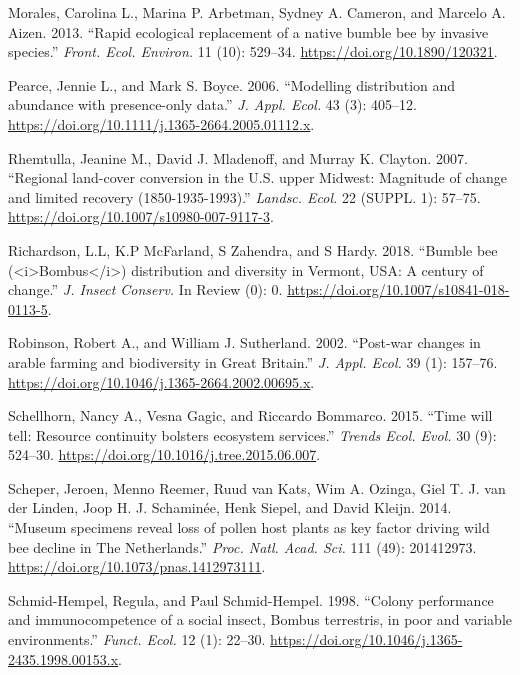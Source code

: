 \documentclass[11pt,]{article}
\begin{document}
\leavevmode\hypertarget{ref-Morales2013}{}%
Morales, Carolina L., Marina P. Arbetman, Sydney A. Cameron, and Marcelo
A. Aizen. 2013. ``Rapid ecological replacement of a native bumble bee by
invasive species.'' \emph{Front. Ecol. Environ.} 11 (10): 529--34.
\url{https://doi.org/10.1890/120321}.

\leavevmode\hypertarget{ref-Pearce2006}{}%
Pearce, Jennie L., and Mark S. Boyce. 2006. ``Modelling distribution and
abundance with presence-only data.'' \emph{J. Appl. Ecol.} 43 (3):
405--12. \url{https://doi.org/10.1111/j.1365-2664.2005.01112.x}.

\leavevmode\hypertarget{ref-Rhemtulla2007a}{}%
Rhemtulla, Jeanine M., David J. Mladenoff, and Murray K. Clayton. 2007.
``Regional land-cover conversion in the U.S. upper Midwest: Magnitude of
change and limited recovery (1850-1935-1993).'' \emph{Landsc. Ecol.} 22
(SUPPL. 1): 57--75. \url{https://doi.org/10.1007/s10980-007-9117-3}.

\leavevmode\hypertarget{ref-Richardson2018}{}%
Richardson, L.L, K.P McFarland, S Zahendra, and S Hardy. 2018. ``Bumble
bee (\textless{}i\textgreater{}Bombus\textless{}/i\textgreater{})
distribution and diversity in Vermont, USA: A century of change.''
\emph{J. Insect Conserv.} In Review (0): 0.
\url{https://doi.org/10.1007/s10841-018-0113-5}.

\leavevmode\hypertarget{ref-Robinson2002}{}%
Robinson, Robert A., and William J. Sutherland. 2002. ``Post-war changes
in arable farming and biodiversity in Great Britain.'' \emph{J. Appl.
Ecol.} 39 (1): 157--76.
\url{https://doi.org/10.1046/j.1365-2664.2002.00695.x}.

\leavevmode\hypertarget{ref-Schellhorn2015c}{}%
Schellhorn, Nancy A., Vesna Gagic, and Riccardo Bommarco. 2015. ``Time
will tell: Resource continuity bolsters ecosystem services.''
\emph{Trends Ecol. Evol.} 30 (9): 524--30.
\url{https://doi.org/10.1016/j.tree.2015.06.007}.

\leavevmode\hypertarget{ref-Scheper2014}{}%
Scheper, Jeroen, Menno Reemer, Ruud van Kats, Wim A. Ozinga, Giel T. J.
van der Linden, Joop H. J. Schaminée, Henk Siepel, and David Kleijn.
2014. ``Museum specimens reveal loss of pollen host plants as key factor
driving wild bee decline in The Netherlands.'' \emph{Proc. Natl. Acad.
Sci.} 111 (49): 201412973.
\url{https://doi.org/10.1073/pnas.1412973111}.

\leavevmode\hypertarget{ref-Schmid-Hempel1998a}{}%
Schmid-Hempel, Regula, and Paul Schmid-Hempel. 1998. ``Colony
performance and immunocompetence of a social insect, Bombus terrestris,
in poor and variable environments.'' \emph{Funct. Ecol.} 12 (1): 22--30.
\url{https://doi.org/10.1046/j.1365-2435.1998.00153.x}.
\end{document}
